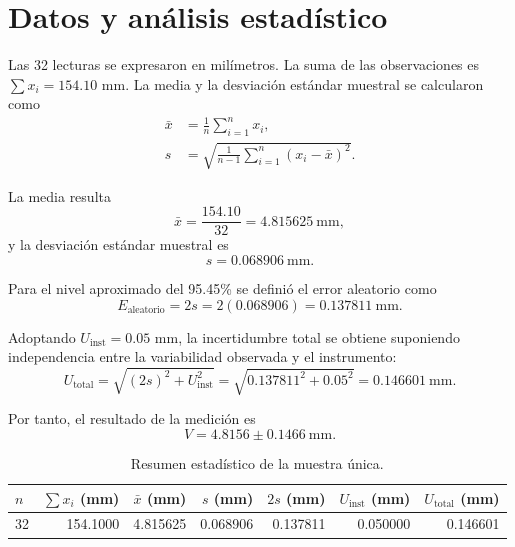 \documentclass[paper=a4, fontsize=11pt]{scrartcl}
\numberwithin{equation}{section}
\numberwithin{figure}{section}
\numberwithin{table}{section}
\begin{document}
\section{Datos y análisis estadístico}
Las 32 lecturas se expresaron en milímetros. La suma de las observaciones es $\sum x_i=154.10$ mm. La media y la desviación estándar muestral se calcularon como
\begin{align}
    \bar{x} &= \frac{1}{n}\sum_{i=1}^{n}x_i,\\
    s &= \sqrt{\frac{1}{n-1}\sum_{i=1}^{n}(x_i-\bar{x})^2}.
\end{align}

La media resulta
\begin{equation}
    \bar{x}=\frac{154.10}{32}=4.815625\ \mathrm{mm},
\end{equation}
\noindent y la desviación estándar muestral es
\begin{equation}
    s=0.068906\ \mathrm{mm}.
\end{equation}

Para el nivel aproximado del 95.45\% se definió el error aleatorio como
\begin{equation}
    E_{\mathrm{aleatorio}}=2s=2(0.068906)=0.137811\ \mathrm{mm}.
\end{equation}

Adoptando $U_{\mathrm{inst}}=0.05$ mm, la incertidumbre total se obtiene suponiendo independencia entre la variabilidad observada y el instrumento:
\begin{equation}
    U_{\mathrm{total}}=\sqrt{(2s)^2+U_{\mathrm{inst}}^2}
    =\sqrt{0.137811^2+0.05^2}=0.146601\ \mathrm{mm}.
\end{equation}

Por tanto, el resultado de la medición es
\begin{equation}
    \boxed{V=4.8156\pm0.1466\ \mathrm{mm}}.
\end{equation}

\begin{table}[H]
\centering
\caption{Resumen estadístico de la muestra única.}
\label{tab:estadistica}
\begin{tabular}{lrrrrrr}
\toprule
$n$ & $\sum x_i$ (mm) & $\bar{x}$ (mm) & $s$ (mm) & $2s$ (mm) & $U_{\mathrm{inst}}$ (mm) & $U_{\mathrm{total}}$ (mm)\\
\midrule
32 & 154.1000 & 4.815625 & 0.068906 & 0.137811 & 0.050000 & 0.146601\\
\bottomrule
\end{tabular}
\end{table}
\end{document}
